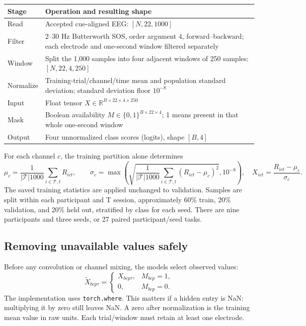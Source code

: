 \documentclass[11pt,a4paper]{article}
\newcommand{\code}[1]{{\small\nolinkurl{#1}}}
\begin{document}
\begin{tabularx}{\linewidth}{@{}L{42mm}Y@{}}
\toprule
Stage & Operation and resulting shape \\
\midrule
Read & Accepted cue-aligned EEG: $[N,22,1000]$ \\
Filter & 2--30 Hz Butterworth SOS, order argument 4, forward--backward; each electrode and one-second window filtered separately \\
Window & Split the 1,000 samples into four adjacent windows of 250 samples: $[N,22,4,250]$ \\
Normalize & Training-trial/channel/time mean and population standard deviation; standard deviation floor $10^{-8}$ \\
Input & Float tensor $X\in\mathbb R^{B\times22\times4\times250}$ \\
Mask & Boolean availability $M\in\{0,1\}^{B\times22\times4}$; 1 means present in that whole one-second window \\
Output & Four unnormalized class scores (logits), shape $[B,4]$ \\
\bottomrule
\end{tabularx}

For each channel $c$, the training partition alone determines
\[
 \mu_c=\frac{1}{|\mathcal T|1000}\sum_{i\in\mathcal T,t}R_{ict},\qquad
 \sigma_c=\max\left(\sqrt{\frac{1}{|\mathcal T|1000}
 \sum_{i\in\mathcal T,t}(R_{ict}-\mu_c)^2},10^{-8}\right),
 \quad X_{ict}=\frac{R_{ict}-\mu_c}{\sigma_c}.
\]
The saved training statistics are applied unchanged to validation. Samples are
split within each participant and T session, approximately 60\% train, 20\%
validation, and 20\% held out, stratified by class for each seed. There are
nine participants and three seeds, or 27 paired participant/seed tasks.

\subsection*{Removing unavailable values safely}
Before any convolution or channel mixing, the models select observed values:
\[
 \widetilde X_{bcp\tau}=\begin{cases}
 X_{bcp\tau},&M_{bcp}=1,\\0,&M_{bcp}=0.
 \end{cases}
\]
The implementation uses \code{torch.where}. This matters if a hidden entry is
NaN: multiplying it by zero still leaves NaN. A zero after normalization is
the training mean value in raw units. Each trial/window must retain at least
one electrode.
\end{document}
